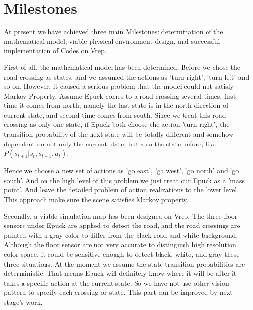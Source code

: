 \documentclass[a4paper, 11pt]{article} %
\begin{document}
\section{Milestones}
At present we have achieved three main Milestones: determination of the mathematical model, viable physical environment design, and successful implementation of Codes on Vrep.

First of all, the mathematical model has been determined. Before we chose the road crossing as states, and we assumed the actions as 'turn right', 'turn left' and so on. However, it caused a serious problem that the model could not satisfy Markov Property. Assume Epuck comes to a road crossing several times, first time it comes from north, namely the last state is in the north direction of current state, and second time comes from south. Since we treat this road crossing as only one state, if Epuck both choose the action 'turn right', the transition probability of the next state will be totally different and somehow dependent on not only the current state, but also the state before, like $P(s_{t+1}|s_{t},s_{t-1},a_{t})$.

Hence we choose a new set of actions as 'go east', 'go west', 'go north' and 'go south'. And on the high level of this problem we just treat our Epuck as a 'mass point'. And leave the detailed problem of action realizations to the lower level. This approach make sure the scene satisfies Markov property. 

Secondly, a viable simulation map has been designed on Vrep. The three floor sensors under Epuck are applied to detect the road, and the road crossings are painted with a gray color to differ from the black road and white background. Although the floor sensor are not very accurate to distinguish high resolution color space, it could be sensitive enough to detect black, white, and gray these three situations. At the moment we assume the state transition probabilities are deterministic. That means Epuck will definitely know where it will be after it takes a specific action at the current state. So we have not use other vision pattern to specify each crossing or state. This part can be improved by next stage's work. 
\end{document}
